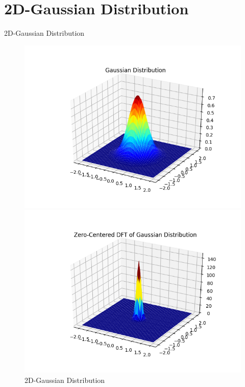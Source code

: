 \documentclass[8pt]{beamer}
\begin{document}
\section{2D-Gaussian Distribution}
\begin{frame}[allowframebreaks]{2D-Gaussian Distribution}
\begin{figure}[ht]
    \begin{minipage}[b]{0.45\textwidth}
        \includegraphics[scale=0.35]{../Images/Gaussian.png}
        \caption{2D-Gaussian Distribution}
        \label{fig:GD}
    \end{minipage}
    \begin{minipage}[b]{0.45\textwidth}
        \includegraphics[scale=0.35]{../Images/ZeroCentered_Gaussian_DFT.png}

\end{minipage}
\end{figure}
\end{frame}
\end{document}
